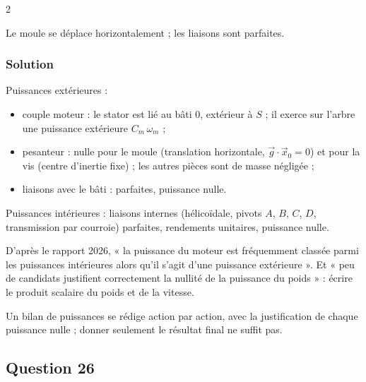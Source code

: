 \documentclass[11pt,a4paper]{article}
\providecommand{\tightlist}{\setlength{\itemsep}{0pt}\setlength{\parskip}{0pt}}
\newcommand{\equationajustee}[1]{%
  \sbox{\boiteequation}{$\displaystyle #1$}%
  \ifdim\wd\boiteequation>\linewidth
    \[\resizebox{\linewidth}{!}{\usebox{\boiteequation}}\]%
  \else
    \[#1\]%
  \fi}
\begin{document}
\begin{indication}{2}

Le moule se déplace horizontalement ; les liaisons sont parfaites.

\end{indication}

\hypertarget{solution-24}{%
\subsubsection{Solution}\label{solution-24}}

Puissances extérieures :

\begin{itemize}
\tightlist
\item
  couple moteur : le stator est lié au bâti \(0\), extérieur à \(S\) ; il exerce sur l'arbre une puissance extérieure \(C_m\,\omega_m\) ;
\item
  pesanteur : nulle pour le moule (translation horizontale, \(\vec g\cdot\vec x_0=0\)) et pour la vis (centre d'inertie fixe) ; les autres pièces sont de masse négligée ;
\item
  liaisons avec le bâti : parfaites, puissance nulle.
\end{itemize}

Puissances intérieures : liaisons internes (hélicoïdale, pivots \(A\), \(B\), \(C\), \(D\), transmission par courroie) parfaites, rendements unitaires, puissance nulle.

\equationajustee{\boxed{P_{ext\to S}=C_m\,\omega_m}}

\equationajustee{\boxed{P_{int}=0}}

\begin{piege}

D'après le rapport 2026, « la puissance du moteur est fréquemment classée parmi les puissances intérieures alors qu'il s'agit d'une puissance extérieure ». Et « peu de candidats justifient correctement la nullité de la puissance du poids » : écrire le produit scalaire du poids et de la vitesse.

\end{piege}

\begin{jury}

Un bilan de puissances se rédige action par action, avec la justification de chaque puissance nulle ; donner seulement le résultat final ne suffit pas.

\end{jury}

\hypertarget{question-26}{%
\subsection{Question 26}\label{question-26}}
\end{document}

